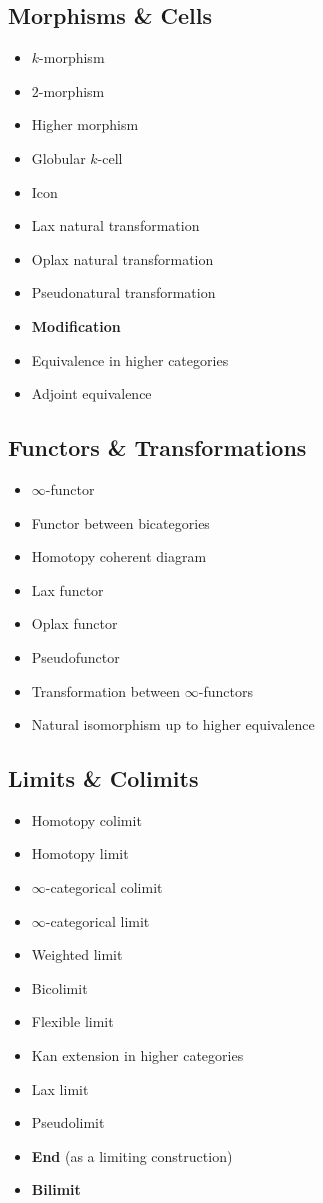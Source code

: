 \subsection{Morphisms \& Cells}

\begin{itemize}
\item $k$-morphism
\item $2$-morphism
\item Higher morphism
\item Globular $k$-cell
\item Icon
\item Lax natural transformation
\item Oplax natural transformation
\item Pseudonatural transformation
\item \textbf{Modification}
\item Equivalence in higher categories
\item Adjoint equivalence
\end{itemize}

\subsection{Functors \& Transformations}

\begin{itemize}
\item $\infty$-functor
\item Functor between bicategories
\item Homotopy coherent diagram
\item Lax functor
\item Oplax functor
\item Pseudofunctor
\item Transformation between $\infty$-functors
\item Natural isomorphism up to higher equivalence
\end{itemize}

\subsection{Limits \& Colimits}

\begin{itemize}
\item Homotopy colimit
\item Homotopy limit
\item $\infty$-categorical colimit
\item $\infty$-categorical limit
\item Weighted limit
\item Bicolimit
\item Flexible limit
\item Kan extension in higher categories
\item Lax limit
\item Pseudolimit
\item \textbf{End} (as a limiting construction)
\item \textbf{Bilimit}
\end{itemize}

